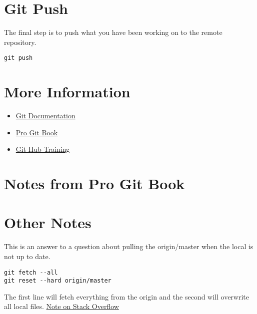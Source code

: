 \documentclass[11pt]{article} %
\begin{document}
\section{Git Push}
The final step is to push what you have been working on to the remote repository.  
\begin{lstlisting}
git push  
\end{lstlisting}
 

\section{More Information}
\begin{itemize}
\item \href{http://git-scm.com/docs}{Git Documentation}
\item  \href{http://git-scm.com/book}{Pro Git Book}
\item \href{https://help.github.com/}{Git Hub Training}
\end{itemize}

\section{Notes from Pro Git Book}

\section{Other Notes}

This is an answer to a question about pulling the origin/master when the local is not up to date. 

\begin{lstlisting}
git fetch --all
git reset --hard origin/master
\end{lstlisting}

The first line will fetch everything from the origin and the second will overwrite all local files. 
\href{http://stackoverflow.com/questions/1125968/force-git-to-overwrite-local-files-on-pull}{Note on Stack Overflow}
\end{document}
